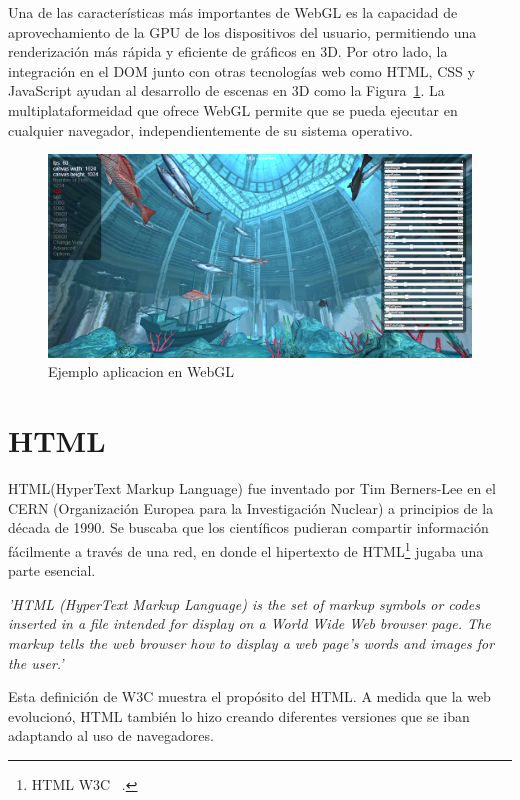 \documentclass[a4paper, 12pt]{book}
\let\cleardoublepage\clearpage
\begin{document}
Una de las características más importantes de WebGL es la capacidad de aprovechamiento de la GPU de los dispositivos del usuario, permitiendo una renderización más rápida y eficiente de gráficos en 3D. Por otro lado, la integración en el DOM junto con otras tecnologías web como HTML, CSS y JavaScript ayudan al desarrollo de escenas en 3D como la Figura~\ref{fig:fishWebGL}. 
La multiplataformeidad que ofrece WebGL permite que se pueda ejecutar en cualquier navegador, independientemente de su sistema operativo.
\begin{figure}[H]  %
  \centering
  \includegraphics[width=0.8\linewidth]{img/WebGL.png}  %
  \caption{Ejemplo aplicacion en WebGL}  %
  \label{fig:fishWebGL}  %
\end{figure}
\cleardoublepage

\section{HTML} 
\label{sec:seccion6}

HTML(HyperText Markup Language) fue inventado por Tim Berners-Lee en el CERN (Organización Europea para la Investigación Nuclear) a principios de la década de 1990. Se buscaba que los científicos pudieran compartir información fácilmente a través de una red, en donde el hipertexto de HTML\footnote{HTML W3C ~\cite{w3c-html-intro}.} jugaba una parte esencial.

\textit{'HTML (HyperText Markup Language) is the set of markup symbols or codes inserted in a file intended for display on a World Wide Web browser page. The markup tells the web browser how to display a web page's words and images for the user.'} \cite{w3c-html-intro}

Esta definición de W3C muestra el propósito del HTML. A medida que la web evolucionó, HTML también lo hizo creando diferentes versiones que se iban adaptando al uso de navegadores.
\end{document}
